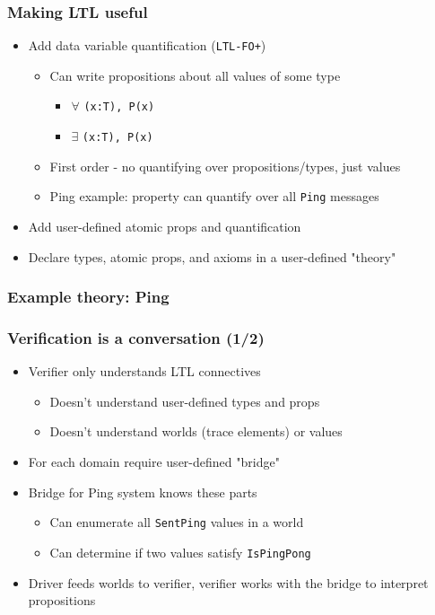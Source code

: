 \documentclass[12pt,aspectratio=169]{beamer}
\begin{document}
\begin{frame}
\frametitle{Making LTL useful}
\begin{itemize}
  \item Add data variable quantification (\texttt{LTL-FO+})
  \begin{itemize}
    \item Can write propositions about all values of some type
    \begin{itemize}
      \item $\forall$ \texttt{(x:T), P(x)}
      \item $\exists$ \texttt{(x:T), P(x)}
    \end{itemize}
    \item First order - no quantifying over propositions/types, just values
    \item Ping example: property can quantify over all \texttt{Ping} messages
  \end{itemize}
  \item Add user-defined atomic props and quantification
  \item Declare types, atomic props, and axioms in a user-defined "theory"
\end{itemize}
\end{frame}

\begin{frame}
\frametitle{Example theory: Ping}
  {\fontsize{10}{12}\selectfont
    
  }
\end{frame}

\begin{frame}
\frametitle{Verification is a conversation (1/2)}
\begin{itemize}
  \item Verifier only understands LTL connectives
  \begin{itemize}
    \item Doesn't understand user-defined types and props
    \item Doesn't understand worlds (trace elements) or values
  \end{itemize}
  \item For each domain require user-defined "bridge"
  \item Bridge for Ping system knows these parts
  \begin{itemize}
    \item Can enumerate all \texttt{SentPing} values in a world
    \item Can determine if two values satisfy \texttt{IsPingPong}
  \end{itemize}
  \item Driver feeds worlds to verifier, verifier works with the bridge to interpret propositions
\end{itemize}
\end{frame}
\end{document}
